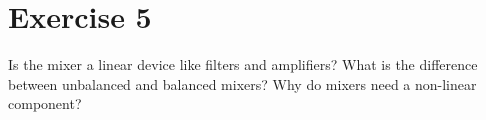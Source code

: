 %
%
%

{}
\section*{Exercise 5}

\begin{question}[subtitle={Mixers}]
	\begin{tasks}
		\task
		Is the mixer a linear device like filters and amplifiers?
		\task
		What is the difference between unbalanced and balanced mixers?
		\task
		Why do mixers need a non-linear component?
	\end{tasks}
\end{question}

\begin{solution}
	\begin{tasks}
	\end{tasks}
\end{solution}


